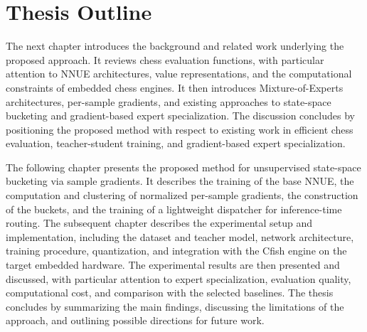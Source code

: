 \section{Thesis Outline}\label{sec:outline}

The next chapter introduces the background and related work underlying the proposed approach. It reviews chess evaluation functions, with particular attention to NNUE architectures, value representations, and the computational constraints of embedded chess engines. It then introduces Mixture-of-Experts architectures, per-sample gradients, and existing approaches to state-space bucketing and gradient-based expert specialization. The discussion concludes by positioning the proposed method with respect to existing work in efficient chess evaluation, teacher-student training, and gradient-based expert specialization.

The following chapter presents the proposed method for unsupervised state-space bucketing via sample gradients. It describes the training of the base NNUE, the computation and clustering of normalized per-sample gradients, the construction of the buckets, and the training of a lightweight dispatcher for inference-time routing. The subsequent chapter describes the experimental setup and implementation, including the dataset and teacher model, network architecture, training procedure, quantization, and integration with the Cfish engine on the target embedded hardware. The experimental results are then presented and discussed, with particular attention to expert specialization, evaluation quality, computational cost, and comparison with the selected baselines. The thesis concludes by summarizing the main findings, discussing the limitations of the approach, and outlining possible directions for future work.

